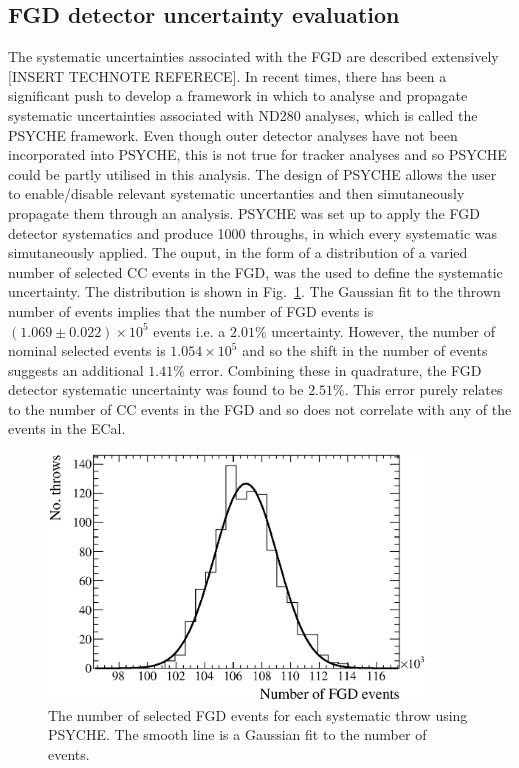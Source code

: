 \subsection{FGD detector uncertainty evaluation}
\label{subsec:FGDDetectorSystematics}
The systematic uncertainties associated with the FGD are described extensively [INSERT TECHNOTE REFERECE].  In recent times, there has been a significant push to develop a framework in which to analyse and propagate systematic uncertainties associated with ND280 analyses, which is called the PSYCHE framework.  Even though outer detector analyses have not been incorporated into PSYCHE, this is not true for tracker analyses and so PSYCHE could be partly utilised in this analysis.  The design of PSYCHE allows the user to enable/disable relevant systematic uncertanties and then simutaneously propagate them through an analysis.  PSYCHE was set up to apply the FGD detector systematics and produce 1000 throughs, in which every systematic was simutaneously applied.  The ouput, in the form of a distribution of a varied number of selected CC events in the FGD, was the used to define the systematic uncertainty.  The distribution is shown in Fig.~\ref{fig:FGDSystematicsNEvents}.  The Gaussian fit to the thrown number of events implies that the number of FGD events is $(1.069\pm0.022)\times10^5$ events i.e. a $2.01\%$ uncertainty.  However, the number of nominal selected events is $1.054\times10^5$ and so the shift in the number of events suggests an additional $1.41\%$ error.  Combining these in quadrature, the FGD detector systematic uncertainty was found to be $2.51\%$.  This error purely relates to the number of CC events in the FGD and so does not correlate with any of the events in the ECal.
\begin{figure}
  \centering
  \includegraphics[width=10cm]{images/measurement/systematics/detector/fgd/fgd_systematics_nevents.eps}
  \caption{The number of selected FGD events for each systematic throw using PSYCHE.  The smooth line is a Gaussian fit to the number of events.}
  \label{fig:FGDSystematicsNEvents}
\end{figure}

